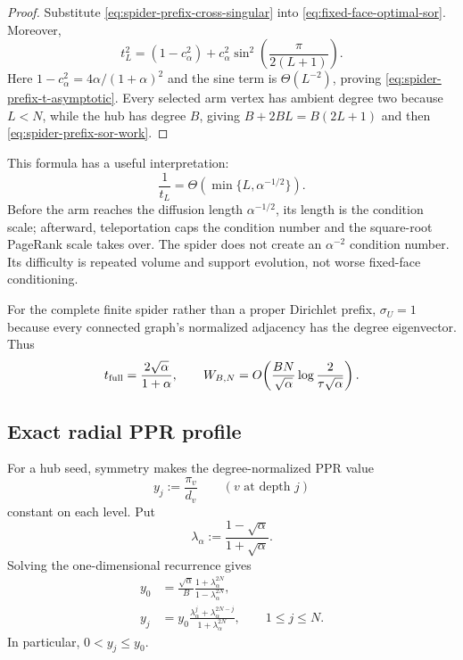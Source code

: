 \begin{proof}
Substitute \eqref{eq:spider-prefix-cross-singular} into
\eqref{eq:fixed-face-optimal-sor}.  Moreover,
\begin{equation*}
 t_L^2=(1-c_\alpha^2)
 +c_\alpha^2\sin^2\!\left(\frac{\pi}{2(L+1)}\right).
\end{equation*}
Here $1-c_\alpha^2=4\alpha/(1+\alpha)^2$ and the sine term is
$\Theta(L^{-2})$, proving \eqref{eq:spider-prefix-t-asymptotic}.  Every
selected arm vertex has ambient degree two because $L<N$, while the hub has
degree $B$, giving $B+2BL=B(2L+1)$ and then
\eqref{eq:spider-prefix-sor-work}.
\end{proof}

This formula has a useful interpretation:
\begin{equation}
 \frac1{t_L}
 =\Theta\!\left(\min\{L,\alpha^{-1/2}\}\right).
 \label{eq:spider-two-regimes}
\end{equation}
Before the arm reaches the diffusion length $\alpha^{-1/2}$, its length is
the condition scale; afterward, teleportation caps the condition number and
the square-root PageRank scale takes over.  The spider does not create an
$\alpha^{-2}$ condition number.  Its difficulty is repeated volume and
support evolution, not worse fixed-face conditioning.

For the complete finite spider rather than a proper Dirichlet prefix,
$\sigma_U=1$ because every connected graph's normalized adjacency has the
degree eigenvector.  Thus
\begin{equation}
 t_{\rm full}=\frac{2\sqrt\alpha}{1+\alpha},
 \qquad
 W_{B,N}=O\!\left(
  \frac{BN}{\sqrt\alpha}
  \log\frac{2}{\tau\sqrt\alpha}
 \right).
 \label{eq:full-spider-sor-work}
\end{equation}

\subsection{Exact radial PPR profile}

For a hub seed, symmetry makes the degree-normalized PPR value
\begin{equation}
 y_j:=\frac{\pi_v}{d_v}
 \qquad (v\text{ at depth }j)
 \label{eq:spider-radial-y}
\end{equation}
constant on each level.  Put
\begin{equation}
 \lambda_\alpha:=\frac{1-\sqrt\alpha}{1+\sqrt\alpha}.
 \label{eq:spider-lambda}
\end{equation}
Solving the one-dimensional recurrence gives
\begin{align}
 y_0&=\frac{\sqrt\alpha}{B}
       \frac{1+\lambda_\alpha^{2N}}
            {1-\lambda_\alpha^{2N}},
 \label{eq:spider-center-profile}\\
 y_j&=y_0
 \frac{\lambda_\alpha^j+\lambda_\alpha^{2N-j}}
      {1+\lambda_\alpha^{2N}},
 \qquad 1\leq j\leq N.
 \label{eq:spider-arm-profile}
\end{align}
In particular, $0<y_j\leq y_0$.


